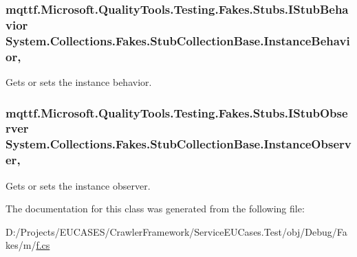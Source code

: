 \hypertarget{class_system_1_1_collections_1_1_fakes_1_1_stub_collection_base_a43dbcd989d36f9287615bb69d6a98c55}{
\subsubsection[{Instance\-Behavior}]{\setlength{\rightskip}{0pt plus 5cm}mqttf.\-Microsoft.\-Quality\-Tools.\-Testing.\-Fakes.\-Stubs.\-I\-Stub\-Behavior System.\-Collections.\-Fakes.\-Stub\-Collection\-Base.\-Instance\-Behavior\hspace{0.3cm}{\ttfamily [get]}, {\ttfamily [set]}}}\label{class_system_1_1_collections_1_1_fakes_1_1_stub_collection_base_a43dbcd989d36f9287615bb69d6a98c55}


Gets or sets the instance behavior.

\hypertarget{class_system_1_1_collections_1_1_fakes_1_1_stub_collection_base_a6d16a1bc6a70bf64e7b41bf14df45d91}{
\subsubsection[{Instance\-Observer}]{\setlength{\rightskip}{0pt plus 5cm}mqttf.\-Microsoft.\-Quality\-Tools.\-Testing.\-Fakes.\-Stubs.\-I\-Stub\-Observer System.\-Collections.\-Fakes.\-Stub\-Collection\-Base.\-Instance\-Observer\hspace{0.3cm}{\ttfamily [get]}, {\ttfamily [set]}}}\label{class_system_1_1_collections_1_1_fakes_1_1_stub_collection_base_a6d16a1bc6a70bf64e7b41bf14df45d91}


Gets or sets the instance observer.



The documentation for this class was generated from the following file\-:\begin{DoxyCompactItemize}
\item 
D\-:/\-Projects/\-E\-U\-C\-A\-S\-E\-S/\-Crawler\-Framework/\-Service\-E\-U\-Cases.\-Test/obj/\-Debug/\-Fakes/m/\hyperlink{m_2f_8cs}{f.\-cs}\end{DoxyCompactItemize}
